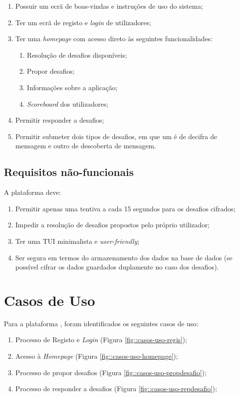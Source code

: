\begin{enumerate}
    \item Possuir um ecrã de boas-vindas e instruções de uso do sistema;
    \item Ter um ecrã de registo e \emph{login} de utilizadores;
    \item Ter uma \textit{homepage} com acesso direto às seguintes funcionalidades:
    \begin{enumerate}
        \item Resolução de desafios disponíveis;
        \item Propor desafios;
        \item Informações sobre a aplicação;
        \item \textit{Scoreboard} dos utilizadores;
    \end{enumerate}
    \item Permitir responder a desafios;
    \item Permitir submeter dois tipos de desafios, em que um é de decifra de mensagem e outro de descoberta de mensagem.
\end{enumerate}


\subsection{Requisitos não-funcionais}
\label{ssec::engsoft:requisitos:nao-funcionais}

A plataforma deve:

\begin{enumerate}
    \item Permitir apenas uma tentiva a cada 15 segundos para os desafios cifrados;
    \item Impedir a resolução de desafios propostos pelo próprio utilizador;
    \item Ter uma \ac{TUI} minimalista e \textit{user-friendly};
    \item Ser segura em termos do armazenamento dos dados na base de dados (se possível cifrar os dados guardados duplamente no caso dos desafios).
\end{enumerate}


\section{Casos de Uso}
\label{sec::engsoft:casos-uso}

Para a plataforma \appname, foram identificados os seguintes casos de uso:
\begin{enumerate}%
    \item Processo de Registo e \emph{Login} (Figura \ref{fig::casos-uso-regis});
    \item Acesso à \textit{Homepage} (Figura \ref{fig::casos-uso-homepage});
    \item Processo de propor desafios (Figura \ref{fig::casos-uso-propdesafio});
    \item Processo de responder a desafios (Figura \ref{fig::casos-uso-repdesafio});
\end{enumerate}

